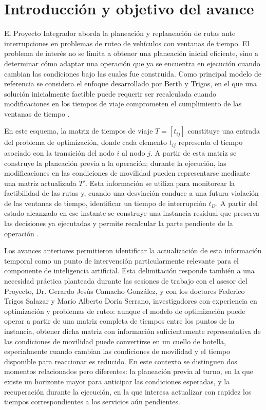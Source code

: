 \documentclass[11pt]{article}
\begin{document}
\tableofcontents
\newpage

\section{Introducción y objetivo del avance}

El Proyecto Integrador aborda la planeación y replaneación de rutas ante interrupciones en problemas de ruteo de vehículos con ventanas de tiempo. El problema de interés no se limita a obtener una planeación inicial eficiente, sino a determinar cómo adaptar una operación que ya se encuentra en ejecución cuando cambian las condiciones bajo las cuales fue construida. Como principal modelo de referencia se considera el enfoque desarrollado por Berth y Trigos, en el que una solución inicialmente factible puede requerir ser recalculada cuando modificaciones en los tiempos de viaje comprometen el cumplimiento de las ventanas de tiempo \parencite{berth_thesis_2025,berth_trigos_2025}.

En este esquema, la matriz de tiempos de viaje $T=[t_{ij}]$ constituye una entrada del problema de optimización, donde cada elemento $t_{ij}$ representa el tiempo asociado con la transición del nodo $i$ al nodo $j$. A partir de esta matriz se construye la planeación previa a la operación; durante la ejecución, las modificaciones en las condiciones de movilidad pueden representarse mediante una matriz actualizada $T'$. Esta información se utiliza para monitorear la factibilidad de las rutas y, cuando una desviación conduce a una futura violación de las ventanas de tiempo, identificar un tiempo de interrupción $t_D$. A partir del estado alcanzado en ese instante se construye una instancia residual que preserva las decisiones ya ejecutadas y permite recalcular la parte pendiente de la operación \parencite{berth_thesis_2025,berth_trigos_2025}.

Los avances anteriores permitieron identificar la actualización de esta información temporal como un punto de intervención particularmente relevante para el componente de inteligencia artificial. Esta delimitación responde también a una necesidad práctica planteada durante las sesiones de trabajo con el asesor del Proyecto, Dr. Gerardo Jesús Camacho González, y con los doctores Federico Trigos Salazar y Mario Alberto Doria Serrano, investigadores con experiencia en optimización y problemas de ruteo: aunque el modelo de optimización puede operar a partir de una matriz completa de tiempos entre los puntos de la instancia, obtener dicha matriz con información suficientemente representativa de las condiciones de movilidad puede convertirse en un cuello de botella, especialmente cuando cambian las condiciones de movilidad y el tiempo disponible para reaccionar es reducido. En este contexto se distinguen dos momentos relacionados pero diferentes: la planeación previa al turno, en la que existe un horizonte mayor para anticipar las condiciones esperadas, y la recuperación durante la ejecución, en la que interesa actualizar con rapidez los tiempos correspondientes a los servicios aún pendientes.
\end{document}
